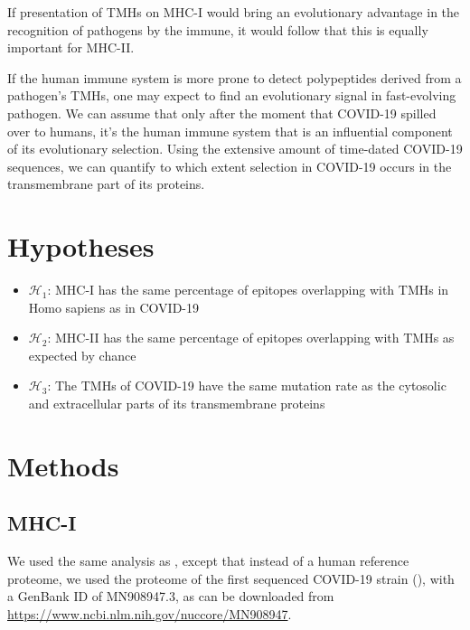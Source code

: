 \documentclass{article}
\begin{document}
If presentation of TMHs on MHC-I would bring an evolutionary advantage 
in the recognition of pathogens by the immune, 
it would follow that this is equally important for MHC-II.

If the human immune system is more prone to detect polypeptides
derived from a pathogen's TMHs, one may expect to find an evolutionary
signal in fast-evolving pathogen. 
We can assume that only after the moment that COVID-19 spilled over 
to humans, it's the human immune system that is an influential component 
of its evolutionary selection.
Using the extensive amount of time-dated COVID-19 sequences,
we can quantify to which extent selection in COVID-19 occurs
in the transmembrane part of its proteins.

\section{Hypotheses}

\begin{itemize}
  \item $\mathcal{H}_1$: MHC-I has the same percentage of epitopes overlapping
    with TMHs in Homo sapiens as in COVID-19
  \item $\mathcal{H}_2$: MHC-II has the same percentage of epitopes overlapping
    with TMHs as expected by chance
  \item $\mathcal{H}_3$: The TMHs of COVID-19 have the same mutation rate 
    as the cytosolic and extracellular parts of its transmembrane proteins
\end{itemize}

\section{Methods}

\subsection{MHC-I}

We used the same analysis as \cite{bianchi2017},
except that instead of a human reference proteome,
we used the proteome of the first sequenced COVID-19 strain (\cite{wu2020new}),
with a GenBank ID of MN908947.3, as can be downloaded 
from \url{https://www.ncbi.nlm.nih.gov/nuccore/MN908947}.
\end{document}

